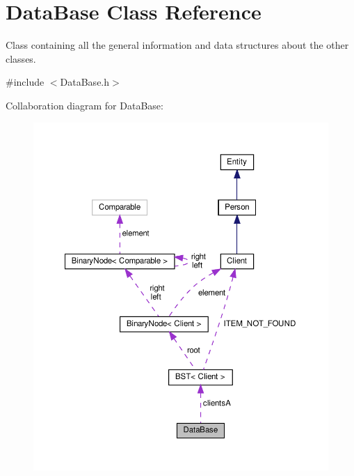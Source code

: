 \hypertarget{classDataBase}{}\section{Data\+Base Class Reference}
\label{classDataBase}


Class containing all the general information and data structures about the other classes.  




{\ttfamily \#include $<$Data\+Base.\+h$>$}



Collaboration diagram for Data\+Base\+:\nopagebreak
\begin{figure}[H]
\begin{center}
\leavevmode
\includegraphics[width=350pt]{classDataBase__coll__graph}
\end{center}
\end{figure}
